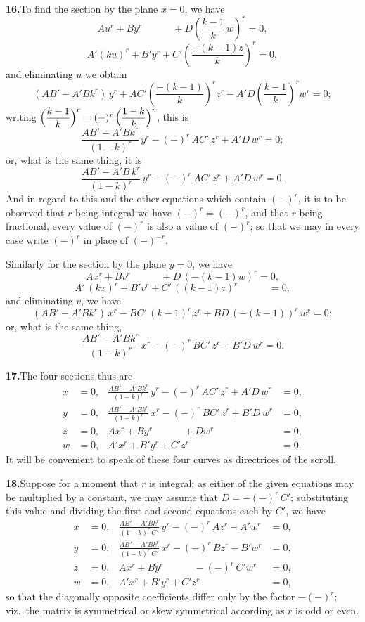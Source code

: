 \documentclass[11pt,a4paper]{article}
\begin{document}
\textbf{16.}\quad To find the section by the plane $x = 0$, we have
\[
Au^{r} + B y^{r} \phantom{{} + C'z^{r}}
        + D\!\left(\frac{k - 1}{k}\,w\right)^{r} = 0,
\]
\[
A'(ku)^{r} + B' y^{r} + C'\!\left(\frac{-(k - 1)z}{k}\right)^{r} = 0,
\]
and eliminating $u$ we obtain
\[
(AB' - A'Bk^{r})\,y^{r} + A C'\!\left(\frac{-(k - 1)}{k}\right)^{r} z^{r}
- A'D\!\left(\frac{k - 1}{k}\right)^{r} w^{r} = 0;
\]
writing $\Bigl(\dfrac{k - 1}{k}\Bigr)^{r} = (-)^{r}\,\Bigl(\dfrac{1 - k}{k}\Bigr)^{r}$,
this is
\[
\frac{AB' - A'Bk^{r}}{(1 - k)^{r}}\,y^{r}
   - (-)^{r}\,A C'\, z^{r} + A'D\, w^{r} = 0;
\]
or, what is the same thing, it is
\[
\frac{AB' - A'B\,k^{r}}{(1 - k)^{r}}\,y^{r}
   - (-)^{r}\,A C'\, z^{r} + A'D\, w^{r} = 0.
\]
And in regard to this and the other equations which contain $(-)^{r}$, it is
to be observed that $r$ being integral we have $(-)^{r} = (-)^{r}$, and that
$r$ being fractional, every value of $(-)^{r}$ is also a value of $(-)^{r}$;
so that we may in every case write $(-)^{r}$ in place of $(-)^{-r}$.

Similarly for the section by the plane $y = 0$, we have
\[
A x^{r} + B v^{r} \phantom{{} + C'z^{r}} + D\,(-(k - 1)w)^{r} = 0,
\]
\[
A'\,(kx)^{r} + B' v^{r} + C'\,((k - 1)z)^{r} \phantom{{} + Dw^{r}} = 0,
\]
and eliminating $v$, we have
\[
(AB' - A'B k^{r})\,x^{r}
   - BC'\,(k - 1)^{r}\,z^{r} + BD\,(-(k - 1))^{r}\,w^{r} = 0;
\]
or, what is the same thing,
\[
\frac{AB' - A'B k^{r}}{(1 - k)^{r}}\,x^{r}
   - (-)^{r}\,BC'\, z^{r} + B'D\, w^{r} = 0.
\]

\textbf{17.}\quad The four sections thus are
\begin{align*}
x &= 0, & \frac{AB' - A'B k^{r}}{(1 - k)^{r}}\,y^{r}
         - (-)^{r}\,AC'\, z^{r} + A'D\, w^{r} &= 0, \\
y &= 0, & \frac{AB' - A'B k^{r}}{(1 - k)^{r}}\,x^{r}
         - (-)^{r}\,BC'\, z^{r} + B'D\, w^{r} &= 0, \\
z &= 0, & A x^{r} + B y^{r} \phantom{{} + C'z^{r}} + D w^{r} &= 0, \\
w &= 0, & A' x^{r} + B' y^{r} + C' z^{r} \phantom{{} + Dw^{r}} &= 0.
\end{align*}
It will be convenient to speak of these four curves as directrices of the
scroll.

\textbf{18.}\quad Suppose for a moment that $r$ is integral; as either of the
given equations may be multiplied by a constant, we may assume that
$D = -(-)^{r}\,C'$; substituting this value and dividing the first and second
equations each by $C'$, we have
\begin{align*}
x &= 0, & \frac{AB' - A'B k^{r}}{(1 - k)^{r}\,C'}\,y^{r}
         - (-)^{r}\,A z^{r} - A' w^{r} &= 0, \\
y &= 0, & \frac{AB' - A'B k^{r}}{(1 - k)^{r}\,C'}\,x^{r}
         - (-)^{r}\,B z^{r} - B' w^{r} &= 0, \\
z &= 0, & A x^{r} + B y^{r} \phantom{{} + C'z^{r}} - (-)^{r}\,C' w^{r} &= 0, \\
w &= 0, & A' x^{r} + B' y^{r} + C' z^{r} \phantom{{} + Dw^{r}} &= 0,
\end{align*}
so that the diagonally opposite coefficients differ only by the factor
$-(-)^{r}$; viz.\ the matrix is symmetrical or skew symmetrical according as
$r$ is odd or even.
\end{document}
